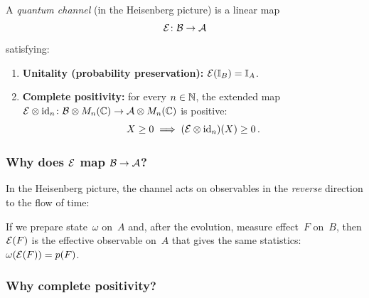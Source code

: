 \begin{definition}\label{def:channel}
  A \emph{quantum channel} (in the Heisenberg picture) is a linear map
  \[
    \mathcal{E}\colon \mathcal{B} \to \mathcal{A}
  \]
  satisfying:
  \begin{enumerate}[(1)]
    \item \textbf{Unitality (probability preservation):}
      $\mathcal{E}(\mathbb{I}_B) = \mathbb{I}_A$.
    \item \textbf{Complete positivity:} for every $n \in \mathbb{N}$, the
      extended map
      $\mathcal{E} \otimes \operatorname{id}_n\colon \mathcal{B} \otimes M_{n}(\mathbb{C}) \to \mathcal{A} \otimes M_{n}(\mathbb{C})$
      is positive:
      \begin{equation}\label{eq:cp}
        X \geq 0 \;\Longrightarrow\;
        (\mathcal{E} \otimes \operatorname{id}_n)(X) \geq 0\,.
      \end{equation}
  \end{enumerate}
\end{definition}

\subsubsection{Why does $\mathcal{E}$ map $\mathcal{B} \to \mathcal{A}$?}

In the Heisenberg picture, the channel acts on observables in the
\emph{reverse} direction to the flow of time:

\begin{center}
\end{center}

If we prepare state~$\omega$ on~$A$ and, after the evolution, measure
effect~$F$ on~$B$, then $\mathcal{E}(F)$ is the effective observable on~$A$
that gives the same statistics: $\omega(\mathcal{E}(F)) = p(F)$.

\subsubsection{Why complete positivity?}\label{sec:why-cp}

